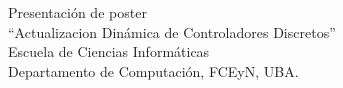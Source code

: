 \item[Julio 2016] Presentaci\'on de poster\\
``Actualizacion Din\'amica de Controladores Discretos''\\
Escuela de Ciencias Inform\'aticas\\
Departamento de Computaci\'on, FCEyN, UBA.

